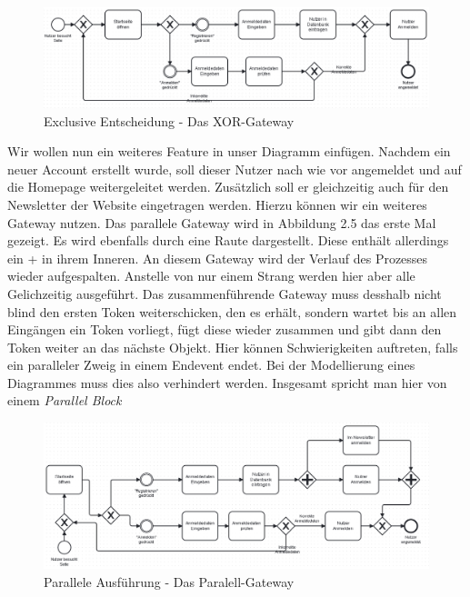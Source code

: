 \begin{figure}
\centering
\includegraphics[scale=0.5]{Figures/Beispiel5}
\decoRule
\caption[XOR-Gateway]{Exclusive Entscheidung - Das XOR-Gateway}
\label{fig:Task}
\end{figure}Wir wollen nun ein weiteres Feature in unser Diagramm einfügen. Nachdem ein neuer Account erstellt wurde, soll dieser Nutzer nach wie vor angemeldet und auf die Homepage weitergeleitet werden. Zusätzlich soll er gleichzeitig auch für den Newsletter der Website eingetragen werden. Hierzu können wir ein weiteres Gateway nutzen. Das parallele Gateway wird in Abbildung 2.5 das erste Mal gezeigt. Es wird ebenfalls durch eine Raute dargestellt. Diese enthält allerdings ein + in ihrem Inneren. An diesem Gateway wird der Verlauf des Prozesses wieder aufgespalten. Anstelle von nur einem Strang werden hier aber alle Gelichzeitig ausgeführt. Das zusammenführende Gateway muss desshalb nicht blind den ersten Token weiterschicken, den es erhält, sondern wartet bis an allen Eingängen ein Token vorliegt, fügt diese wieder zusammen und gibt dann den Token weiter an das nächste Objekt. Hier können Schwierigkeiten auftreten, falls ein paralleler Zweig in einem Endevent endet. Bei der Modellierung eines Diagrammes muss dies also verhindert werden. Insgesamt spricht man hier von einem \textit{Parallel Block}\\
\begin{figure}
\centering
\includegraphics[scale=0.5]{Figures/Beispiel6}
\decoRule
\caption[Paralell-Gateway]{Parallele Ausführung - Das Paralell-Gateway}
\label{fig:Task}
\end{figure}
